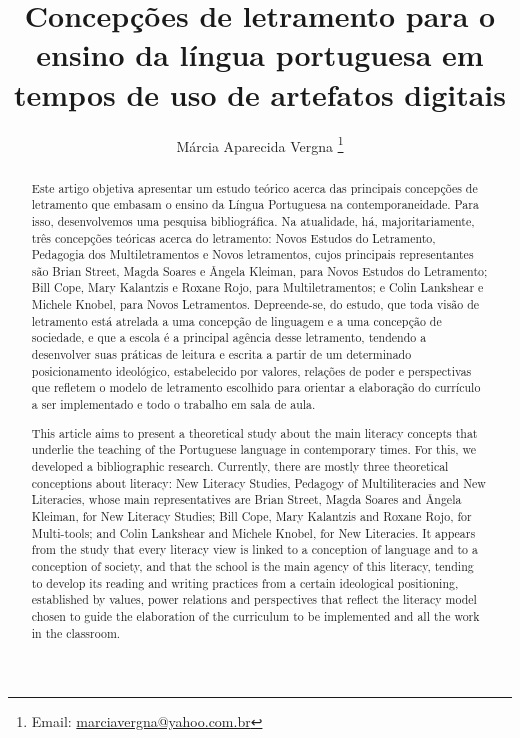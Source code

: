 \documentclass{textolivre}
\title{Concepções de letramento para o ensino da língua portuguesa em tempos de uso de artefatos digitais}
\author[1]{Márcia Aparecida Vergna \thanks{Email: \url{marciavergna@yahoo.com.br}}}
\affil[1]{Universidade Estácio de Sá, Brasil.}
\begin{document}
\maketitle

\begin{polyabstract}
\begin{abstract}
Este artigo objetiva apresentar um estudo teórico acerca das principais
concepções de letramento que embasam o ensino da Língua Portuguesa na
contemporaneidade. Para isso, desenvolvemos uma pesquisa bibliográfica. Na
atualidade, há, majoritariamente, três concepções teóricas acerca do
letramento: Novos Estudos do Letramento, Pedagogia dos Multiletramentos e Novos
letramentos, cujos principais representantes são Brian Street, Magda Soares e
Ângela Kleiman, para Novos Estudos do Letramento; Bill Cope, Mary Kalantzis e
Roxane Rojo, para Multiletramentos; e Colin Lankshear e Michele Knobel, para
Novos Letramentos. Depreende-se, do estudo, que toda visão de letramento está
atrelada a uma concepção de linguagem e a uma concepção de sociedade, e que a
escola é a principal agência desse letramento, tendendo a desenvolver suas
práticas de leitura e escrita a partir de um determinado posicionamento
ideológico, estabelecido por valores, relações de poder e perspectivas que
refletem o modelo de letramento escolhido para orientar a elaboração do
currículo a ser implementado e todo o trabalho em sala de aula.

\end{abstract}

\begin{english}
\begin{abstract}
This article aims to present a theoretical study about the main literacy
concepts that underlie the teaching of the Portuguese language in contemporary
times. For this, we developed a bibliographic research. Currently, there are
mostly three theoretical conceptions about literacy: New Literacy Studies,
Pedagogy of Multiliteracies and New Literacies, whose main representatives are
Brian Street, Magda Soares and Ângela Kleiman, for New Literacy Studies; Bill
Cope, Mary Kalantzis and Roxane Rojo, for Multi-tools; and Colin Lankshear and
Michele Knobel, for New Literacies. It appears from the study that every
literacy view is linked to a conception of language and to a conception of
society, and that the school is the main agency of this literacy, tending to
develop its reading and writing practices from a certain ideological
positioning, established by values, power relations and perspectives that
reflect the literacy model chosen to guide the elaboration of the curriculum to
be implemented and all the work in the classroom.

\end{abstract}
\end{english}

\end{polyabstract}
\end{document}
